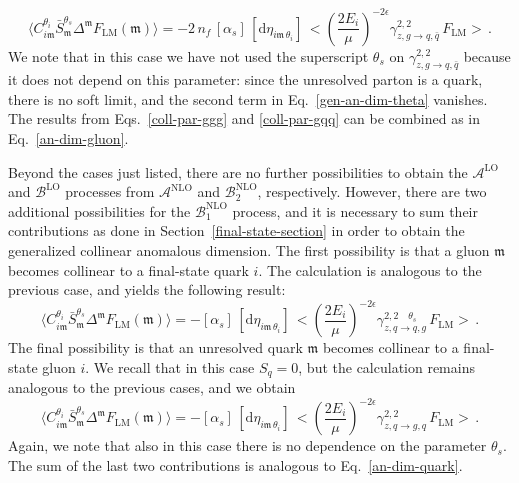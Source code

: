 \documentclass[a4paper, 12pt]{book}
\newcommand{\um}{\mathfrak{m}}
\begin{document}
\begin{equation}
  \langle C_{i\mathfrak{m}}^{\theta_i} \bar{S}_{\mathfrak{m}}^{\theta_s} \Delta^{\mathfrak{m}} F_{\mathrm{LM}}(\mathfrak{m})\rangle = -2 \, n_f \, [\alpha_s] \,[\mathrm{d}\eta_{i\um \, \theta_i}] \, \bigl< \left(\frac{2E_i}{\mu}\right)^{-2\epsilon} \gamma^{2,2}_{z,g \to q, \bar{q}} \, F_{\mathrm{LM}} \bigr> \, . 
  \label{coll-par-gqq}
\end{equation}
We note that in this case we have not used the superscript $\theta_s$ on $\gamma^{2,2}_{z,g \to q, \bar{q}}$ because it does not depend on this parameter: since the unresolved parton is a quark, there is no soft limit, and the second term in Eq.~\ref{gen-an-dim-theta} vanishes. The results from Eqs.~\ref{coll-par-ggg} and \ref{coll-par-gqq} can be combined as in Eq.~\ref{an-dim-gluon}.

Beyond the cases just listed, there are no further possibilities to obtain the $\mathcal{A}^{\mathrm{LO}}$ and $\mathcal{B}^{\mathrm{LO}}$ processes from $\mathcal{A}^{\mathrm{NLO}}$ and $\mathcal{B}_2^{\mathrm{NLO}}$, respectively. However, there are two additional possibilities for the $\mathcal{B}_1^{\mathrm{NLO}}$ process, and it is necessary to sum their contributions as done in Section~\ref{final-state-section} in order to obtain the generalized collinear anomalous dimension. The first possibility is that a gluon $\um$ becomes collinear to a final-state quark $i$. The calculation is analogous to the previous case, and yields the following result:
\begin{equation}
  \langle C_{i\mathfrak{m}}^{\theta_i} \bar{S}_{\mathfrak{m}}^{\theta_s} \Delta^{\mathfrak{m}} F_{\mathrm{LM}}(\mathfrak{m})\rangle = -[\alpha_s] \,[\mathrm{d}\eta_{i\um \, \theta_i}] \, \bigl< \left(\frac{2E_i}{\mu}\right)^{-2\epsilon} \gamma^{2,2 \quad \theta_s}_{z,q \to q, g} \, F_{\mathrm{LM}} \bigr> \, . 
\end{equation}
The final possibility is that an unresolved quark $\um$ becomes collinear to a final-state gluon $i$. We recall that in this case $S_q=0$, but the calculation remains analogous to the previous cases, and we obtain
\begin{equation}
  \langle C_{i\mathfrak{m}}^{\theta_i} \bar{S}_{\mathfrak{m}}^{\theta_s} \Delta^{\mathfrak{m}} F_{\mathrm{LM}}(\mathfrak{m})\rangle = -[\alpha_s] \,[\mathrm{d}\eta_{i\um \, \theta_i}] \, \bigl< \left(\frac{2E_i}{\mu}\right)^{-2\epsilon} \gamma^{2,2}_{z,q \to g, q} \, F_{\mathrm{LM}} \bigr> \, . 
\end{equation}
Again, we note that also in this case there is no dependence on the parameter $\theta_s$. The sum of the last two contributions is analogous to Eq.~\ref{an-dim-quark}. \\
\end{document}
